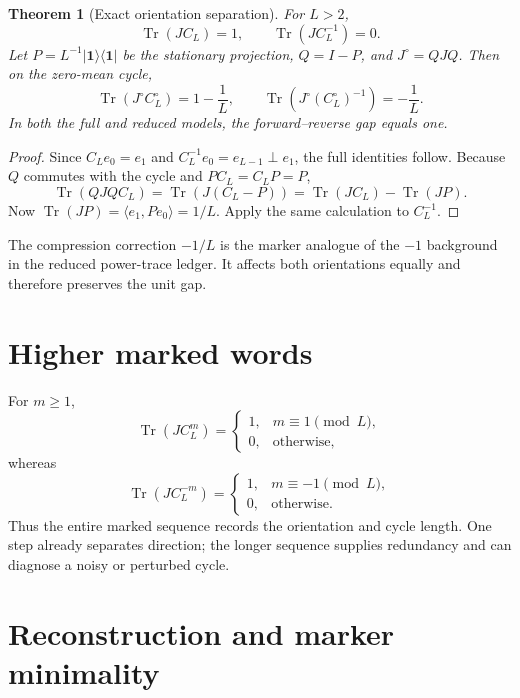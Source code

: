 \documentclass[12pt]{article}
\newtheorem{theorem}{Theorem}[section]
\theoremstyle{remark}
\newcommand{\Tr}{\operatorname{Tr}}
\begin{document}
\begin{theorem}[Exact orientation separation]\label{thm:marker}
For $L>2$,
\begin{equation}\label{eq:full-marker}
 \Tr(JC_L)=1,
 \qquad
 \Tr(JC_L^{-1})=0.
\end{equation}
Let $P=L^{-1}|\mathbf1\rangle\langle\mathbf1|$ be the stationary projection,
$Q=I-P$, and $J^\circ=QJQ$.  Then on the zero-mean cycle,
\begin{equation}\label{eq:reduced-marker}
 \Tr(J^\circ C_L^\circ)=1-\frac1L,
 \qquad
 \Tr(J^\circ(C_L^\circ)^{-1})=-\frac1L.
\end{equation}
In both the full and reduced models, the forward--reverse gap equals one.
\end{theorem}

\begin{proof}
Since $C_Le_0=e_1$ and $C_L^{-1}e_0=e_{L-1}\perp e_1$, the full identities
follow.  Because $Q$ commutes with the cycle and $PC_L=C_LP=P$,
\[
 \Tr(QJQ C_L)=\Tr(J(C_L-P))
 =\Tr(JC_L)-\Tr(JP).
\]
Now $\Tr(JP)=\langle e_1,Pe_0\rangle=1/L$.  Apply the same calculation to
$C_L^{-1}$.
\end{proof}

The compression correction $-1/L$ is the marker analogue of the $-1$
background in the reduced power-trace ledger.  It affects both orientations
equally and therefore preserves the unit gap.

\section{Higher marked words}

For $m\ge1$,
\[
 \Tr(JC_L^m)=
 \begin{cases}
 1,&m\equiv1\pmod L,\\
 0,&\text{otherwise},
 \end{cases}
\]
whereas
\[
 \Tr(JC_L^{-m})=
 \begin{cases}
 1,&m\equiv-1\pmod L,\\
 0,&\text{otherwise}.
 \end{cases}
\]
Thus the entire marked sequence records the orientation and cycle length.
One step already separates direction; the longer sequence supplies
redundancy and can diagnose a noisy or perturbed cycle.

\section{Reconstruction and marker minimality}
\end{document}
